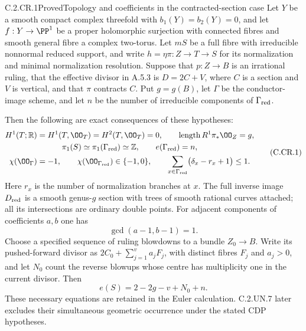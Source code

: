 \begin{statement}{C.2.CR.1}{Proved}{Topology and coefficients in the contracted-section case}
Let $Y$ be a smooth compact complex threefold with
$b_1(Y)=b_2(Y)=0$, and let $f:Y\to\PP^1$ be a proper
holomorphic surjection with connected fibres and smooth
general fibre a complex two-torus. Let $mS$
be a full fibre with irreducible nonnormal reduced support, and
write $h=\eta\pi:Z\to T\to S$ for its normalization and minimal
normalization resolution. Suppose that $p:Z\to B$ is an
irrational ruling, that the effective divisor in A.5.3 is
$D=2C+V$, where $C$ is a section and $V$ is vertical, and
that $\pi$ contracts $C$. Put $g=g(B)$, let $\Gamma$ be the
conductor-image scheme, and let $n$ be the number of irreducible
components of $\Gamma_{\rm red}$.

Then the following are exact consequences of these hypotheses:
\[
\begin{gathered}
 H^1(T;\mathbb R)=H^1(T,\OO_T)=H^2(T,\OO_T)=0,
 \qquad \operatorname{length}R^1\pi_*\OO_Z=g,\\
 \pi_1(S)\simeq\pi_1(\Gamma_{\rm red})\simeq\mathbb Z,
 \qquad e(\Gamma_{\rm red})=n,\\
 \chi(\OO_\Gamma)=-1,\qquad
 \chi(\OO_{\Gamma_{\rm red}})\in\{-1,0\},\qquad
 \sum_{x\in\Gamma_{\rm red}}\bigl(\delta_x-r_x+1\bigr)\le1.
\end{gathered}
\tag{C.CR.1}
\]
Here $r_x$ is the number of normalization branches at $x$.
The full inverse image $D_{\rm red}$ is a smooth genus-$g$
section with trees of smooth rational curves attached; all
its intersections are ordinary double points. For adjacent
components of coefficients $a,b$ one has
\[
                         \gcd(a-1,b-1)=1.          \tag{C.CR.2}
\]
Choose a specified sequence of ruling blowdowns to a bundle
$Z_0\to B$. Write its pushed-forward divisor as
$2C_0+\sum_{j=1}^{v}a_jF_j$, with distinct fibres $F_j$
and $a_j>0$, and let $N_0$ count the reverse blowups whose
centre has multiplicity one in the current divisor. Then
\[
                     e(S)=2-2g-v+N_0+n.           \tag{C.CR.3}
\]
These necessary equations are retained in the Euler
calculation. C.2.UN.7 later excludes their simultaneous
geometric occurrence under the stated CDP hypotheses.
\end{statement}
